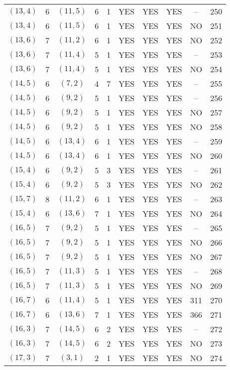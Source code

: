 \begin{longtable}{|c|c|c|c|c|c|c|c|c|c|}
$(13, 4)$ & 6 & $(11, 5)$ & 6 & 1 & YES & YES & YES & -- & 250\\
$(13, 4)$ & 6 & $(11, 5)$ & 6 & 1 & YES & YES & YES & NO & 251\\
$(13, 6)$ & 7 & $(11, 2)$ & 6 & 1 & YES & YES & YES & NO & 252\\
$(13, 6)$ & 7 & $(11, 4)$ & 5 & 1 & YES & YES & YES & -- & 253\\
$(13, 6)$ & 7 & $(11, 4)$ & 5 & 1 & YES & YES & YES & NO & 254\\
$(14, 5)$ & 6 & $(7, 2)$ & 4 & 7 & YES & YES & YES & -- & 255\\
$(14, 5)$ & 6 & $(9, 2)$ & 5 & 1 & YES & YES & YES & -- & 256\\
$(14, 5)$ & 6 & $(9, 2)$ & 5 & 1 & YES & YES & YES & NO & 257\\
$(14, 5)$ & 6 & $(9, 2)$ & 5 & 1 & YES & YES & YES & NO & 258\\
$(14, 5)$ & 6 & $(13, 4)$ & 6 & 1 & YES & YES & YES & -- & 259\\
$(14, 5)$ & 6 & $(13, 4)$ & 6 & 1 & YES & YES & YES & NO & 260\\
$(15, 4)$ & 6 & $(9, 2)$ & 5 & 3 & YES & YES & YES & -- & 261\\
$(15, 4)$ & 6 & $(9, 2)$ & 5 & 3 & YES & YES & YES & NO & 262\\
$(15, 7)$ & 8 & $(11, 2)$ & 6 & 1 & YES & YES & YES & -- & 263\\
$(15, 4)$ & 6 & $(13, 6)$ & 7 & 1 & YES & YES & YES & NO & 264\\
$(16, 5)$ & 7 & $(9, 2)$ & 5 & 1 & YES & YES & YES & -- & 265\\
$(16, 5)$ & 7 & $(9, 2)$ & 5 & 1 & YES & YES & YES & NO & 266\\
$(16, 5)$ & 7 & $(9, 2)$ & 5 & 1 & YES & YES & YES & NO & 267\\
$(16, 5)$ & 7 & $(11, 3)$ & 5 & 1 & YES & YES & YES & -- & 268\\
$(16, 5)$ & 7 & $(11, 3)$ & 5 & 1 & YES & YES & YES & NO & 269\\
$(16, 7)$ & 6 & $(11, 4)$ & 5 & 1 & YES & YES & YES & 311 & 270\\
$(16, 7)$ & 6 & $(13, 6)$ & 7 & 1 & YES & YES & YES & 366 & 271\\
$(16, 3)$ & 7 & $(14, 5)$ & 6 & 2 & YES & YES & YES & -- & 272\\
$(16, 3)$ & 7 & $(14, 5)$ & 6 & 2 & YES & YES & YES & NO & 273\\
$(17, 3)$ & 7 & $(3, 1)$ & 2 & 1 & YES & YES & YES & NO & 274\\

\end{longtable}
